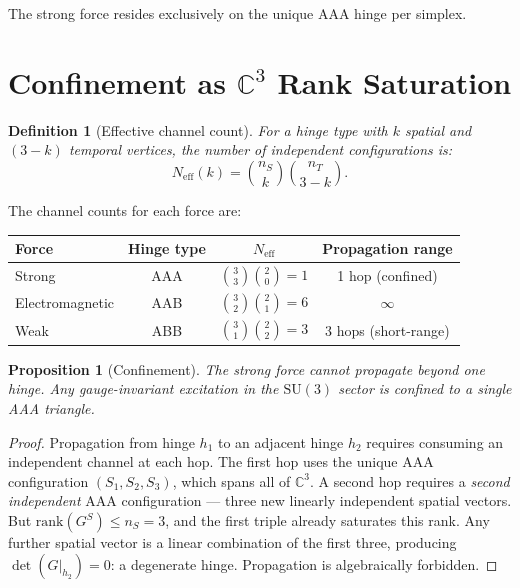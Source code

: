 \documentclass[12pt]{article}
\newtheorem{proposition}[theorem]{Proposition}
\newtheorem{definition}[theorem]{Definition}
\theoremstyle{remark}
\begin{document}
\noindent
The strong force resides exclusively on the unique AAA hinge per simplex.

\section{Confinement as $\mathbb{C}^3$ Rank Saturation}
\label{sec:confinement}

\begin{definition}[Effective channel count]
For a hinge type with $k$ spatial and $(3-k)$ temporal vertices, the
number of independent configurations is:
\begin{equation}
N_{\mathrm{eff}}(k) = \binom{n_S}{k} \binom{n_T}{3-k}.
\end{equation}
\end{definition}

\noindent
The channel counts for each force are:

\begin{center}
\begin{tabular}{lccc}
\hline
Force & Hinge type & $N_{\mathrm{eff}}$ & Propagation range \\
\hline
Strong & AAA & $\binom{3}{3}\binom{2}{0} = 1$ & 1 hop (confined) \\
Electromagnetic & AAB & $\binom{3}{2}\binom{2}{1} = 6$ & $\infty$ \\
Weak & ABB & $\binom{3}{1}\binom{2}{2} = 3$ & 3 hops (short-range) \\
\hline
\end{tabular}
\end{center}

\begin{proposition}[Confinement]
\label{prop:confinement}
The strong force cannot propagate beyond one hinge. Any gauge-invariant
excitation in the $\mathrm{SU}(3)$ sector is confined to a single AAA
triangle.
\end{proposition}

\begin{proof}
Propagation from hinge $h_1$ to an adjacent hinge $h_2$ requires
consuming an independent channel at each hop. The first hop uses the
unique AAA configuration $(S_1, S_2, S_3)$, which spans all of
$\mathbb{C}^3$. A second hop requires a \emph{second independent} AAA
configuration --- three new linearly independent spatial vectors. But
$\mathrm{rank}(G^S) \leq n_S = 3$, and the first triple already
saturates this rank. Any further spatial vector is a linear combination
of the first three, producing $\det(G|_{h_2}) = 0$: a degenerate hinge.
Propagation is algebraically forbidden.
\end{proof}
\end{document}
